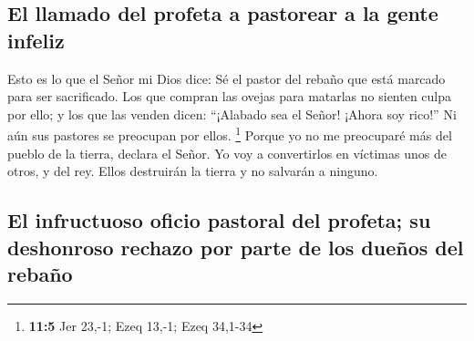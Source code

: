 \hypertarget{el-llamado-del-profeta-a-pastorear-a-la-gente-infeliz}{%
\subsection{El llamado del profeta a pastorear a la gente
infeliz}\label{el-llamado-del-profeta-a-pastorear-a-la-gente-infeliz}}

 Esto es lo que el Señor mi Dios dice: Sé el pastor del
rebaño que está marcado para ser sacrificado.  Los que
compran las ovejas para matarlas no sienten culpa por ello; y los que
las venden dicen: ``¡Alabado sea el Señor! ¡Ahora soy rico!'' Ni aún sus
pastores se preocupan por ellos. \footnote{\textbf{11:5} Jer 23,-1; Ezeq
  13,-1; Ezeq 34,1-34}  Porque yo no me preocuparé más del
pueblo de la tierra, declara el Señor. Yo voy a convertirlos en víctimas
unos de otros, y del rey. Ellos destruirán la tierra y no salvarán a
ninguno.

\hypertarget{el-infructuoso-oficio-pastoral-del-profeta-su-deshonroso-rechazo-por-parte-de-los-dueuxf1os-del-rebauxf1o}{%
\subsection{El infructuoso oficio pastoral del profeta; su deshonroso
rechazo por parte de los dueños del
rebaño}\label{el-infructuoso-oficio-pastoral-del-profeta-su-deshonroso-rechazo-por-parte-de-los-dueuxf1os-del-rebauxf1o}}

